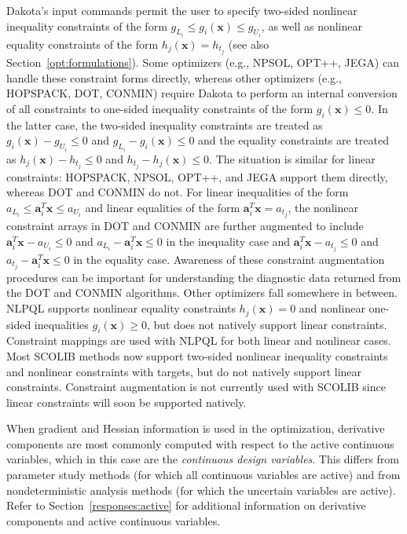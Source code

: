 Dakota's input commands permit the user to specify two-sided nonlinear
inequality constraints of the form $g_{L_{i}} \leq g_{i}(\mathbf{x})
\leq g_{U_{i}}$, as well as nonlinear equality constraints of the form
$h_{j}(\mathbf{x}) = h_{t_{j}}$ (see also
Section~\ref{opt:formulations}). Some optimizers
(e.g., NPSOL, OPT++, JEGA) can handle these constraint forms directly,
whereas other optimizers (e.g., HOPSPACK, DOT, CONMIN) require Dakota
to perform an internal conversion of all constraints to one-sided
inequality constraints of the form $g_{i}(\mathbf{x}) \leq 0$. In the
latter case, the two-sided inequality constraints are treated as
$g_{i}(\mathbf{x}) - g_{U_{i}} \leq 0$ and $g_{L_{i}} -
g_{i}(\mathbf{x}) \leq 0$ and the equality constraints are treated as
$h_{j}(\mathbf{x}) - h_{t_{j}} \leq 0$ and $h_{t_{j}} -
h_{j}(\mathbf{x}) \leq 0$. The situation is similar for linear
constraints: HOPSPACK, NPSOL, OPT++, and JEGA support them directly,
whereas DOT and CONMIN do not.  For linear inequalities of the form
$a_{L_{i}} \leq \mathbf{a}_{i}^{T}\mathbf{x} \leq a_{U_{i}}$ and
linear equalities of the form $\mathbf{a}_{i}^{T}\mathbf{x} =
a_{t_{j}}$, the nonlinear constraint arrays in DOT and CONMIN are
further augmented to include $\mathbf{a}_{i}^{T}\mathbf{x} - a_{U_{i}}
\leq 0$ and $a_{L_{i}} - \mathbf{a}_{i}^{T}\mathbf{x} \leq 0$ in the
inequality case and $\mathbf{a}_{i}^{T}\mathbf{x} - a_{t_{j}} \leq 0$
and $a_{t_{j}} - \mathbf{a}_{i}^{T}\mathbf{x} \leq 0$ in the equality
case. Awareness of these constraint augmentation procedures can be
important for understanding the diagnostic data returned from the DOT
and CONMIN algorithms.  Other optimizers fall somewhere in between.
NLPQL supports nonlinear equality constraints $h_{j}(\mathbf{x}) = 0$
and nonlinear one-sided inequalities $g_{i}(\mathbf{x}) \geq 0$, but
does not natively support linear constraints.  Constraint mappings are
used with NLPQL for both linear and nonlinear cases.  Most SCOLIB
methods now support two-sided nonlinear inequality constraints and
nonlinear constraints with targets, but do not natively support linear
constraints.  Constraint augmentation is not currently used with
SCOLIB since linear constraints will soon be supported natively.

When gradient and Hessian information is used in the optimization,
derivative components are most commonly computed with respect to the
active continuous variables, which in this case are the
\emph{continuous design variables}. This differs from parameter study
methods (for which all continuous variables are active) and from
nondeterministic analysis methods (for which the uncertain variables
are active).  Refer to Section~\ref{responses:active} for additional
information on derivative components and active continuous variables.


